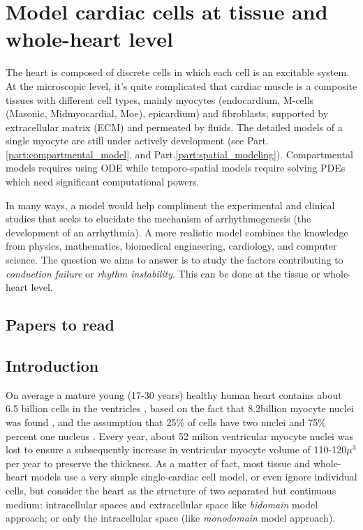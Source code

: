 
\chapter{Model cardiac cells at tissue and whole-heart level}
\label{chap:model-cardiac-cells}

The heart is composed of discrete cells in which each cell is an excitable
system. At the microscopic level, it's quite complicated that cardiac muscle is
a composite tissues with different cell types, mainly myocytes
(endocardium, M-cells (Masonic, Midmyocardial, Moe), epicardium) and
fibroblasts, supported by extracellular matrix (ECM) and permeated by fluids.
The detailed models of a single myocyte are still under actively development
(see Part.\ref{part:compartmental_model}, and Part.\ref{part:spatial_modeling}).
Compartmental models requires using ODE while temporo-spatial models require
solving PDEs which need significant computational powers.

In many ways, a model would help compliment the experimental and clinical
studies that seeks to elucidate the mechanism of arrhythmogenesis (the development of an
arrhythmia). A more realistic model combines the knowledge from physics,
mathematics, biomedical engineering, cardiology, and computer science. The
question we aims to answer is to study the factors contributing to {\it
conduction failure} or {\it rhythm instability}. This can be done at the tissue
or whole-heart level.


\section{Papers to read}

\citep{spach1995}


\section{Introduction}

On average a mature young (17-30 years) healthy human heart contains about 6.5
billion cells in the ventricles \citep{clayton2010}, based on the fact that
8.2billion myocyte nuclei was found \citep{olivetti1991}, and the assumption
that 25\% of cells have two nuclei and 75\% percent one nucleus
\citep{olivetti1996}.
Every year, about 52 milion ventricular myocyte nuclei was lost to ensure a
subsequently increase in ventricular myocyte volume of 110-120$\mu^3$ per year
\citep{olivetti1991} to preserve the thickness. As a matter of fact, most tissue
and whole-heart models use a very simple single-cardiac cell model, or even
ignore individual cells, but consider the heart as the structure of two
separated but continuous medium: intracellular spaces and extracellular space
like {\it bidomain} model approach; or only the intracellular space (like {\it
monodomain} model approach).


